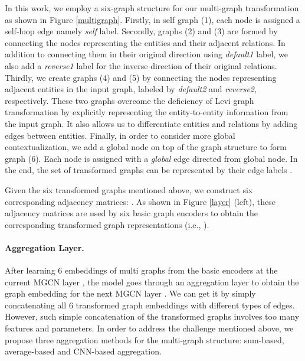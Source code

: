 \documentclass[11pt,a4paper]{article}
\begin{document}
In this work, we employ a six-graph structure for our multi-graph transformation as shown in Figure \ref{multigraph}.
Firstly, in self graph (1), each node is assigned a self-loop edge namely \textit{self} label.
Secondly, graphs (2) and (3) are formed by connecting the nodes representing the entities and their adjacent relations.
In addition to connecting them in their original direction using \textit{default1} label, we also add a \textit{reverse1} label for the inverse direction of their original relations.
Thirdly, we create graphs (4) and (5) by connecting the nodes representing adjacent entities in the input graph, labeled by \textit{default2} and \textit{reverse2}, respectively.
These two graphs overcome the deficiency of Levi graph transformation by explicitly representing the entity-to-entity information from the input graph.
It also allows us to differentiate entities and relations by adding edges between entities.
Finally, in order to consider more global contextualization, we add a global node on top of the graph structure to form graph (6).
Each node is assigned with a \textit{global} edge directed from global node.
In the end, the set of transformed graphs can be represented by their edge labels .



Given the six transformed graphs mentioned above, we construct six corresponding adjacency matrices: . 
As shown in Figure \ref{layer} (left), these adjacency matrices are used by six basic graph encoders to obtain the corresponding transformed graph representations (i.e., ).




\begin{figure*}[t!]
\caption{\label{multigraph} An example of multi-graph transformation.
}
\end{figure*}




\paragraph{Aggregation Layer.}
After learning 6 embeddings of multi graphs from the basic encoders at the current MGCN layer , the model goes through an aggregation layer to obtain the graph embedding for the next MGCN layer . 
We can get it by simply concatenating all 6 transformed graph embeddings with different types of edges.
However, such simple concatenation of the transformed graphs involves too many features and parameters.
In order to address the challenge mentioned above, 
we propose three aggregation methods for the multi-graph structure: sum-based, average-based and CNN-based aggregation.
\end{document}
